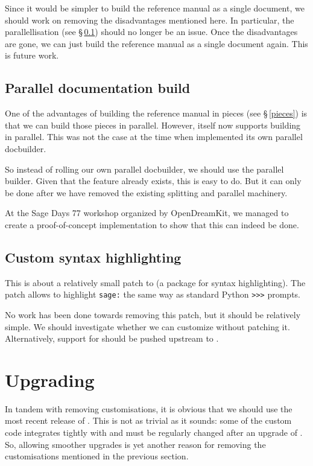 \documentclass{deliverablereport}
\begin{document}
Since it would be simpler to build the reference manual as a single document,
we should work on removing the disadvantages mentioned here.
In particular, the parallellisation (see \S\,\ref{parallel})
should no longer be an issue.
Once the disadvantages are gone, we can just build the reference manual
as a single document again.
This is future work.

\subsection{Parallel documentation build}\label{parallel}

One of the advantages of building the reference manual in pieces
(see \S\,\ref{pieces}) is that we can build those pieces in parallel.
However, \Sphinx itself now supports building in parallel.
This was not the case at the time when \Sage
implemented its own parallel docbuilder.

So instead of rolling our own parallel docbuilder,
we should use the \Sphinx parallel builder.
Given that the feature already exists, this is easy to do.
But it can only be done after we have removed the existing
splitting and parallel machinery.

At the Sage Days 77 workshop organized by OpenDreamKit,
we managed to create a proof-of-concept implementation
to show that this can indeed be done.

\subsection{Custom syntax highlighting}

This is about a relatively small patch to \Pygments
(a package for syntax highlighting).
The patch allows to highlight \texttt{sage:} the same way
as standard Python \texttt{>>>} prompts.

No work has been done towards removing this patch,
but it should be relatively simple.
We should investigate whether we can customize \Pygments without
patching it.
Alternatively, support for \Sage should be pushed upstream to \Pygments.

\section{Upgrading \Sphinx}

In tandem with removing customisations, it is obvious that we
should use the most recent release of \Sphinx.
This is not as trivial as it sounds:
some of the custom code integrates tightly with \Sphinx
and must be regularly changed after an upgrade of \Sphinx.
So, allowing smoother upgrades is yet another reason for
removing the customisations mentioned in the previous section.
\end{document}
